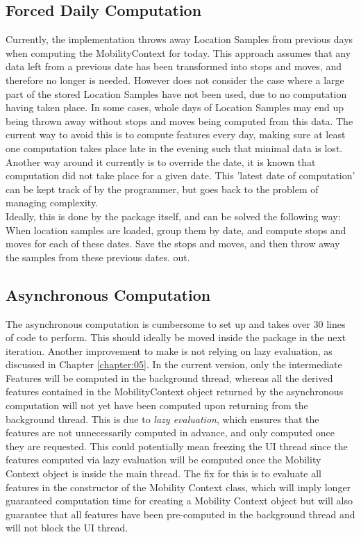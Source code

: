 \subsection{Forced Daily Computation}
Currently, the implementation throws away Location Samples from previous days when computing the MobilityContext for today. This approach assumes that any data left from a previous date has been transformed into stops and moves, and therefore no longer is needed. However does not consider the case where a large part of the stored Location Samples have not been used, due to no computation having taken place. In some cases, whole days of Location Samples may end up being thrown away without stops and moves being computed from this data. The current way to avoid this is to compute features every day, making sure at least one computation takes place late in the evening such that minimal data is lost. Another way around it currently is to override the date, it is known that computation did not take place for a given date. This 'latest date of computation' can be kept track of by the programmer, but goes back to the problem of managing complexity. \\

Ideally, this is done by the package itself, and can be solved the following way:
When location samples are loaded, group them by date, and compute stops and moves for each of these dates. Save the stops and moves, and then throw away the samples from these previous dates. out.

\subsection{Asynchronous Computation}
The asynchronous computation is cumbersome to set up and takes over 30 lines of code to perform. This should ideally be moved inside the package in the next iteration. Another improvement to make is not relying on lazy evaluation, as discussed in Chapter \ref{chapter:05}. In the current version, only the intermediate Features will be computed in the background thread, whereas all the derived features contained in the MobilityContext object returned by the asynchronous computation will not yet have been computed upon returning from the background thread. This is due to \textit{lazy evaluation}, which ensures that the features are not unnecessarily computed in advance, and only computed once they are requested. This could potentially mean freezing the UI thread since the features computed via lazy evaluation will be computed once the Mobility Context object is inside the main thread. The fix for this is to evaluate all features in the constructor of the Mobility Context class, which will imply longer guaranteed computation time for creating a Mobility Context object but will also guarantee that all features have been pre-computed in the background thread and will not block the UI thread. 

